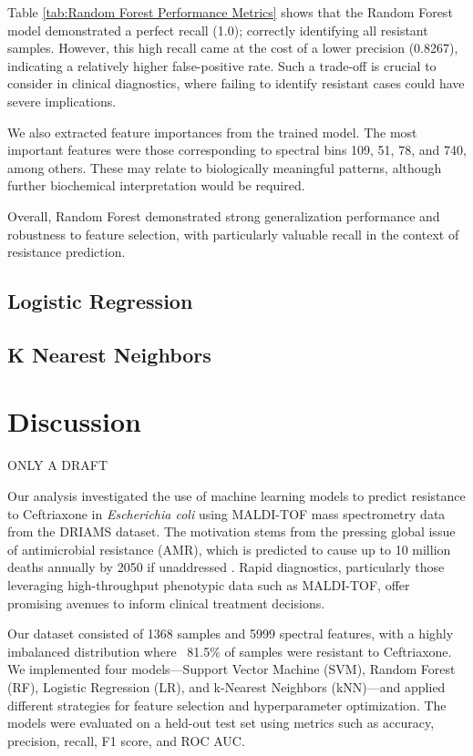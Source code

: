 \documentclass{article}
\begin{document}
Table \ref{tab:Random Forest Performance Metrics} shows that the Random Forest model demonstrated a perfect recall (1.0); correctly identifying all resistant samples. However, this high recall came at the cost of a lower precision (0.8267), indicating a relatively higher false-positive rate. Such a trade-off is crucial to consider in clinical diagnostics, where failing to identify resistant cases could have severe implications.

We also extracted feature importances from the trained model. The most important features were those corresponding to spectral bins 109, 51, 78, and 740, among others. These may relate to biologically meaningful patterns, although further biochemical interpretation would be required.

Overall, Random Forest demonstrated strong generalization performance and robustness to feature selection, with particularly valuable recall in the context of resistance prediction.

\subsection{Logistic Regression}

\subsection{K Nearest Neighbors}

\section{Discussion}

ONLY A DRAFT

Our analysis investigated the use of machine learning models to predict resistance to Ceftriaxone in \textit{Escherichia coli} using MALDI-TOF mass spectrometry data from the DRIAMS dataset. The motivation stems from the pressing global issue of antimicrobial resistance (AMR), which is predicted to cause up to 10 million deaths annually by 2050 if unaddressed \citep{doi:10.1016/S1473-3099(15)70136-9}. Rapid diagnostics, particularly those leveraging high-throughput phenotypic data such as MALDI-TOF, offer promising avenues to inform clinical treatment decisions.

Our dataset consisted of 1368 samples and 5999 spectral features, with a highly imbalanced distribution where ~81.5\% of samples were resistant to Ceftriaxone. We implemented four models—Support Vector Machine (SVM), Random Forest (RF), Logistic Regression (LR), and k-Nearest Neighbors (kNN)—and applied different strategies for feature selection and hyperparameter optimization. The models were evaluated on a held-out test set using metrics such as accuracy, precision, recall, F1 score, and ROC AUC.
\end{document}
